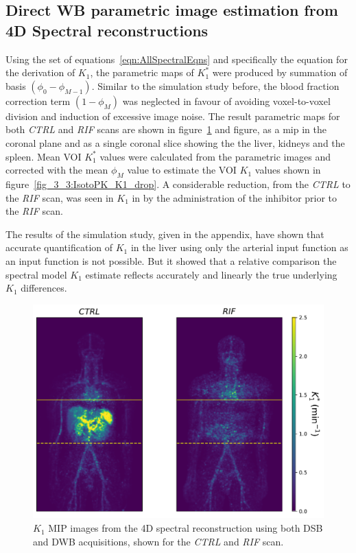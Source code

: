 \subsection{Direct WB parametric image estimation from 4D Spectral reconstructions}
Using the set of equations~\ref{eqn:AllSpectralEqns} and specifically the equation for the derivation of $K_1$, the parametric maps of $K_1^{*}$ were produced by summation of basis $(\phi_0-\phi_{M-1})$. Similar to the simulation study before, the blood fraction correction term $(1-\phi_M)$ was neglected in favour of avoiding voxel-to-voxel division and induction of excessive image noise. The result parametric maps for both \textit{CTRL} and \textit{RIF} scans are shown in figure~\ref{fig_3_3:IsotoPK_K1_MIP} and figure, as a \gls{mip} in the coronal plane and as a single coronal slice showing the the liver, kidneys and the spleen.
Mean VOI $K_1^{*}$ values were calculated from the parametric images and corrected with the mean $\phi_M$ value to estimate the VOI $K_1$ values shown in figure~\ref{fig_3_3:IsotoPK_K1_drop}. A considerable reduction, from the \textit{CTRL} to the \textit{RIF} scan, was seen in $K_1$ in by the administration of the inhibitor prior to the \textit{RIF} scan. 

The results of the simulation study, given in the appendix, have shown that accurate quantification of $K_1$ in the liver using only the arterial input function as an input function is not possible. But it showed that a relative comparison the spectral model $K_1$ estimate reflects accurately and linearly the true underlying $K_1$ differences.

\begin{figure} [h!]
\centering
\includegraphics[scale=0.5,angle=0]{3_Results/3_3_DWB_Reconstruction/figures/3_3_IsotoPK_K1_MIPs.pdf}
\caption{$K_1$ MIP images from the 4D spectral reconstruction using both DSB and DWB acquisitions, shown for the \textit{CTRL} and \textit{RIF} scan.}
\label{fig_3_3:IsotoPK_K1_MIP}
\end{figure} 

